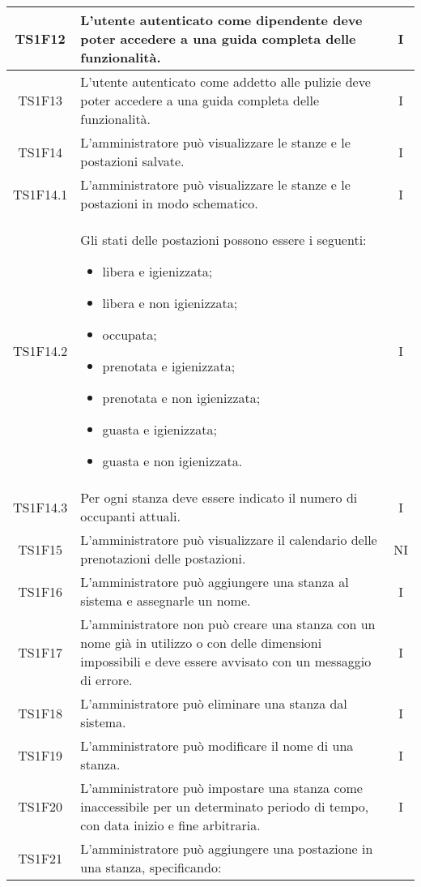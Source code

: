 \begin{center}
\begin{longtable}{|c|p{10cm}|c|}
			\hline
			TS1F12 & L'utente autenticato come dipendente deve poter accedere a una guida completa delle funzionalità. & I \\			
			\hline
			TS1F13 & L'utente autenticato come addetto alle pulizie deve poter accedere a una guida completa delle funzionalità. & I \\
			\hline
			TS1F14 & L'amministratore può visualizzare le stanze e le postazioni salvate. & I \\			
			\hline
			TS1F14.1 & L'amministratore può visualizzare le stanze e le postazioni in modo schematico. & I \\			
			\hline
			TS1F14.2 & Gli stati delle postazioni possono essere i seguenti:
			 \begin{itemize}
			 	\item libera e igienizzata;
			 	\item libera e non igienizzata;
			 	\item occupata;
			 	\item prenotata e igienizzata;
			 	\item prenotata e non igienizzata;
			 	\item guasta e igienizzata;
			 	\item guasta e non igienizzata.
			 \end{itemize}
			 & I \\			
			\hline
			TS1F14.3 & Per ogni stanza deve essere indicato il numero di occupanti attuali. & I \\			
			\hline
			TS1F15 & L'amministratore può visualizzare il calendario delle prenotazioni delle postazioni. & NI \\			
			\hline
			TS1F16 & L'amministratore può aggiungere una stanza al sistema e assegnarle un nome. & I \\			
			\hline
			TS1F17 & L'amministratore non può creare una stanza con un nome già in utilizzo o con delle dimensioni impossibili e deve essere avvisato con un messaggio di errore. & I \\			
			\hline
			TS1F18 & L'amministratore può eliminare una stanza dal sistema. & I \\			
			\hline
			TS1F19 & L'amministratore può modificare il nome di una stanza. & I \\			
			\hline
			TS1F20 & L'amministratore può impostare una stanza come inaccessibile per un determinato periodo di tempo, con data inizio e fine arbitraria. & I \\			
			\hline
			TS1F21 & L'amministratore può aggiungere una postazione in una stanza, specificando:

\end{longtable}
\end{center}
